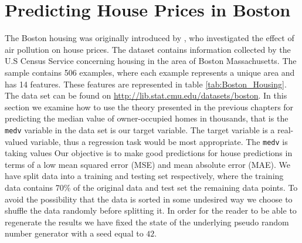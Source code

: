 \section{Predicting House Prices in Boston} \label{sec:Boston_housing}
The Boston housing was originally introduced by \cite{HARRISON197881}, who investigated the effect of air pollution on house prices. 
The dataset contains information collected by the U.S Census Service concerning housing in the area of Boston Massachusetts. The sample contains 506 examples, where each example represents a unique area and has 14 features. These features are represented in table \ref{tab:Boston_Housing}. The data set can be found on \href{http://lib.stat.cmu.edu/datasets/boston}{http://lib.stat.cmu.edu/datasets/boston}. In this section we examine how to use the theory presented in the previous chapters for predicting the median value of owner-occupied homes in thousands, that is the \texttt{medv} variable in the data set is our target variable. The target variable is a real-valued variable, thus a regression task would be most appropriate.   
The \texttt{medv} is taking values  Our objective is to make good predictions for house predictions in terms of a low mean squared error (MSE) and mean absolute error (MAE). We have split data into a training and testing set respectively, where the training data contains 70\% of the original data and test set the remaining data points. To avoid the possibility that the data is sorted in some undesired way we choose to shuffle the data randomly before splitting it. In order for the reader to be able to regenerate the results we have fixed the state of the underlying pseudo random number generator with a seed equal to $42$. 



